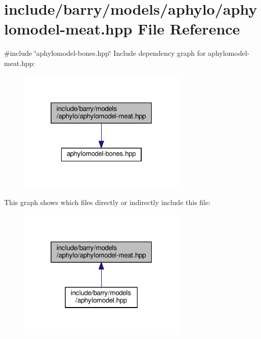 \hypertarget{aphylomodel-meat_8hpp}{}\section{include/barry/models/aphylo/aphylomodel-\/meat.hpp File Reference}
\label{aphylomodel-meat_8hpp}
{\ttfamily \#include \char`\"{}aphylomodel-\/bones.\+hpp\char`\"{}}\newline
Include dependency graph for aphylomodel-\/meat.hpp\+:\nopagebreak
\begin{figure}[H]
\begin{center}
\leavevmode
\includegraphics[width=229pt]{aphylomodel-meat_8hpp__incl}
\end{center}
\end{figure}
This graph shows which files directly or indirectly include this file\+:\nopagebreak
\begin{figure}[H]
\begin{center}
\leavevmode
\includegraphics[width=229pt]{aphylomodel-meat_8hpp__dep__incl}
\end{center}
\end{figure}
